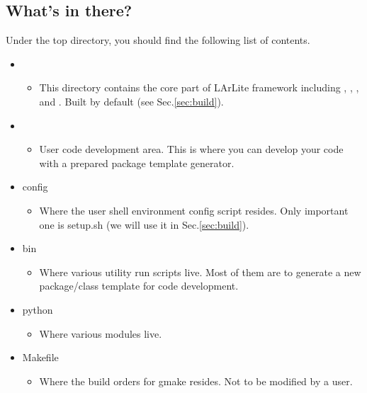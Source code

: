 \subsection{What's in there?}
Under the top directory, you should find the following list of contents.
\begin{itemize}

    \item \Core
      \begin{itemize}
          \item This directory contains the core part of LArLite framework including \Base, \DataFormat, \Analysis, and \LArUtil. Built by default (see Sec.\ref{sec:build}). 
      \end{itemize}

    \item \UserDev
      \begin{itemize}
          \item User code development area. This is where you can develop your code with a prepared package template generator.
      \end{itemize}

    \item {\ttfamily config}
      \begin{itemize}
          \item Where the user shell environment config script resides. Only important one is {\ttfamily setup.sh} (we will use it in Sec.\ref{sec:build}).
      \end{itemize}

    \item {\ttfamily bin}
      \begin{itemize}
          \item Where various utility \python run scripts live. Most of them are to generate a new package/class template for code development.
      \end{itemize}

    \item {\ttfamily python}
      \begin{itemize}
          \item Where various \python modules live. 
      \end{itemize}

    \item {\ttfamily Makefile}
      \begin{itemize}
          \item Where the build orders for {\ttfamily gmake} resides. Not to be modified by a user.
      \end{itemize}


\end{itemize}
